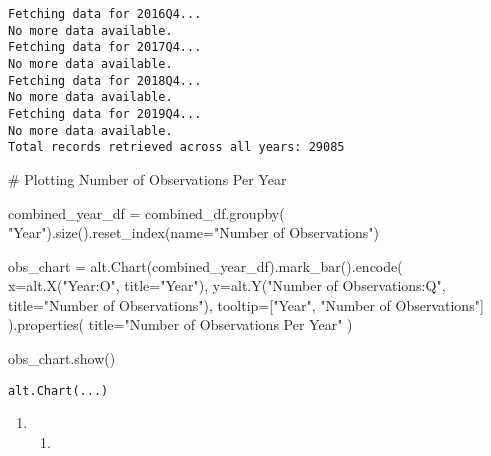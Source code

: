 \documentclass[
  letterpaper,
  DIV=11,
  numbers=noendperiod]{scrartcl}
\newenvironment{Shaded}{\begin{snugshade}}{\end{snugshade}}
\newcommand{\CommentTok}[1]{\textcolor[rgb]{0.37,0.37,0.37}{#1}}
\newcommand{\NormalTok}[1]{\textcolor[rgb]{0.00,0.23,0.31}{#1}}
\newcommand{\OperatorTok}[1]{\textcolor[rgb]{0.37,0.37,0.37}{#1}}
\newcommand{\StringTok}[1]{\textcolor[rgb]{0.13,0.47,0.30}{#1}}
\providecommand{\tightlist}{%
  \setlength{\itemsep}{0pt}\setlength{\parskip}{0pt}}\usepackage{longtable,booktabs,array}
\begin{document}
\begin{verbatim}
Fetching data for 2016Q4...
No more data available.
Fetching data for 2017Q4...
No more data available.
Fetching data for 2018Q4...
No more data available.
Fetching data for 2019Q4...
No more data available.
Total records retrieved across all years: 29085
\end{verbatim}

\begin{Shaded}
\begin{Highlighting}[]
\CommentTok{\# Plotting Number of Observations Per Year}

\NormalTok{combined\_year\_df }\OperatorTok{=}\NormalTok{ combined\_df.groupby(}
    \StringTok{"Year"}\NormalTok{).size().reset\_index(name}\OperatorTok{=}\StringTok{"Number of Observations"}\NormalTok{)}

\NormalTok{obs\_chart }\OperatorTok{=}\NormalTok{ alt.Chart(combined\_year\_df).mark\_bar().encode(}
\NormalTok{    x}\OperatorTok{=}\NormalTok{alt.X(}\StringTok{"Year:O"}\NormalTok{, title}\OperatorTok{=}\StringTok{"Year"}\NormalTok{),}
\NormalTok{    y}\OperatorTok{=}\NormalTok{alt.Y(}\StringTok{"Number of Observations:Q"}\NormalTok{, title}\OperatorTok{=}\StringTok{"Number of Observations"}\NormalTok{),}
\NormalTok{    tooltip}\OperatorTok{=}\NormalTok{[}\StringTok{"Year"}\NormalTok{, }\StringTok{"Number of Observations"}\NormalTok{]}
\NormalTok{).properties(}
\NormalTok{    title}\OperatorTok{=}\StringTok{"Number of Observations Per Year"}
\NormalTok{)}

\NormalTok{obs\_chart.show()}
\end{Highlighting}
\end{Shaded}

\begin{verbatim}
alt.Chart(...)
\end{verbatim}

\begin{enumerate}
\def\labelenumi{\arabic{enumi}.}
\setcounter{enumi}{3}
\tightlist
\item
  \begin{enumerate}
  \def\labelenumii{\alph{enumii}.}
  \tightlist
  \item
  \end{enumerate}
\end{enumerate}
\end{document}
